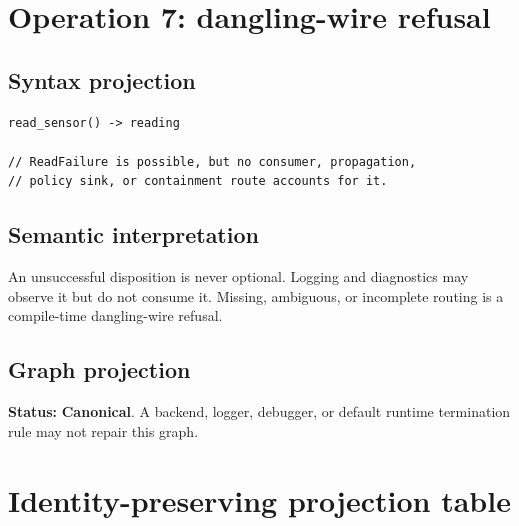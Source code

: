 \documentclass[11pt,a4paper]{article}
\newcommand{\canonical}{\textcolor{LyraGreen}{\textbf{Canonical}}\xspace}
\begin{document}
\section{Operation 7: dangling-wire refusal}

\subsection*{Syntax projection}

\begin{lstlisting}[style=lyraform]
read_sensor() -> reading

// ReadFailure is possible, but no consumer, propagation,
// policy sink, or containment route accounts for it.
\end{lstlisting}

\subsection*{Semantic interpretation}

An unsuccessful disposition is never optional. Logging and diagnostics may
observe it but do not consume it. Missing, ambiguous, or incomplete routing is
a compile-time dangling-wire refusal.

\subsection*{Graph projection}

\begin{center}
\end{center}

\textbf{Status:} \canonical. A backend, logger, debugger, or default runtime
termination rule may not repair this graph.

\section{Identity-preserving projection table}
\end{document}
